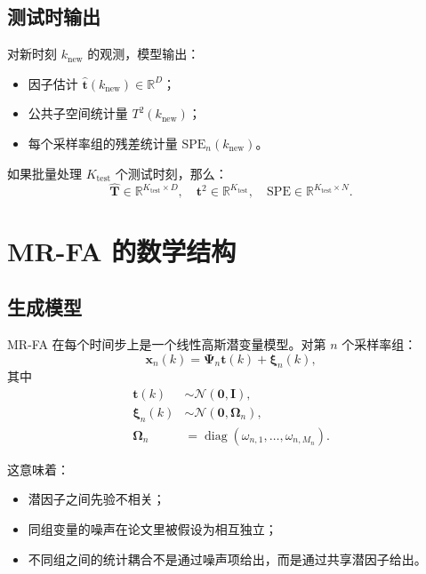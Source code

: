 \documentclass[UTF8]{ctexart}
\begin{document}
\subsection{测试时输出}

对新时刻 $k_{\text{new}}$ 的观测，模型输出：
\begin{itemize}
    \item 因子估计 $\hat{\bm{t}}(k_{\text{new}}) \in \mathbb{R}^{D}$；
    \item 公共子空间统计量 $T^2(k_{\text{new}})$；
    \item 每个采样率组的残差统计量 $\mathrm{SPE}_n(k_{\text{new}})$。
\end{itemize}

如果批量处理 $K_{\text{test}}$ 个测试时刻，那么：
\begin{equation}
    \hat{\bm{T}} \in \mathbb{R}^{K_{\text{test}} \times D}, \quad
    \bm{t}^2 \in \mathbb{R}^{K_{\text{test}}}, \quad
    \mathrm{SPE} \in \mathbb{R}^{K_{\text{test}} \times N}.
\end{equation}

\section{MR-FA 的数学结构}

\subsection{生成模型}

MR-FA 在每个时间步上是一个线性高斯潜变量模型。对第 $n$ 个采样率组：
\begin{equation}
    \bm{x}_n(k) = \bm{\Psi}_n \bm{t}(k) + \bm{\xi}_n(k),
\end{equation}
其中
\begin{align}
    \bm{t}(k) &\sim \mathcal{N}(\bm{0}, \bm{I}), \\
    \bm{\xi}_n(k) &\sim \mathcal{N}(\bm{0}, \bm{\Omega}_n), \\
    \bm{\Omega}_n &= \operatorname{diag}(\omega_{n,1},\dots,\omega_{n,M_n}).
\end{align}

这意味着：
\begin{itemize}
    \item 潜因子之间先验不相关；
    \item 同组变量的噪声在论文里被假设为相互独立；
    \item 不同组之间的统计耦合不是通过噪声项给出，而是通过共享潜因子给出。
\end{itemize}
\end{document}
